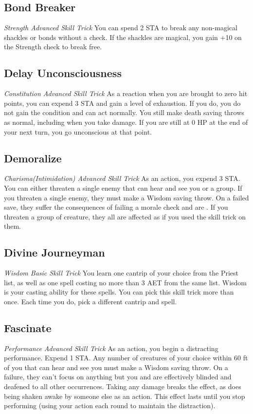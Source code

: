 \subsection{Bond Breaker}
\textit{Strength Advanced Skill Trick}
You can spend 2 STA to break any non-magical shackles or bonds without a check. If the shackles are magical, you gain +10 on the Strength check to break free.

\subsection{Delay Unconsciousness}
\textit{Constitution Advanced Skill Trick}
As a reaction when you are brought to zero hit points, you can expend 3 STA and gain a level of exhaustion. If you do, you do not gain the  condition and can act normally. You still make death saving throws as normal, including when you take damage. If you are still at 0 HP at the end of your next turn, you go unconscious at that point.

\subsection{Demoralize}\label{st:demoralize}
\textit{Charisma(Intimidation) Advanced Skill Trick}
As an action, you expend 3 STA. You can either threaten a single enemy that can hear and see you or a group. If you threaten a single enemy, they must make a Wisdom saving throw. On a failed save, they suffer the consequences of failing a morale check and are . If you threaten a group of creature, they all are affected as if you used the  skill trick on them.

\subsection{Divine Journeyman}
\textit{Wisdom Basic Skill Trick}
You learn one cantrip of your choice from the Priest list, as well as one spell costing no more than 3 AET from the same list. Wisdom is your casting ability for these spells. You can pick this skill trick more than once. Each time you do, pick a different cantrip and spell.

\subsection{Fascinate}
\textit{Performance Advanced Skill Trick}
As an action, you begin a distracting performance. Expend 1 STA. Any number of creatures of your choice within 60 ft of you that can hear and see you must make a Wisdom saving throw. On a failure, they can't focus on anything but you and are effectively blinded and deafened to all other occurrences. Taking any damage breaks the effect, as does being shaken awake by someone else as an action. This effect lasts until you stop performing (using your action each round to maintain the distraction).

